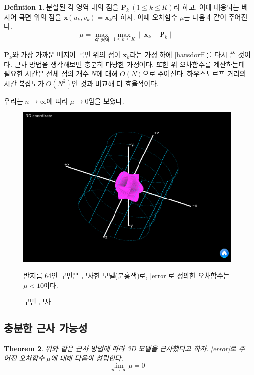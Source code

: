 \documentclass[10pt]{gshs-report-v2.0}
\theoremstyle{theorem}
\newtheorem{theorem}{Theorem}[section]
\theoremstyle{lemma}
\theoremstyle{definition}
\newtheorem{definition}[theorem]{Defintion}
\begin{document}
\begin{definition}
	분할된 각 영역 내의 점을 $\mathbf{P}_k\ (1\leq k\leq K)$라 하고, 이에 대응되는 베지어 곡면 위의 점을 $\mathbf{x}(u_k, v_k)=\mathbf{x}_k$라 하자. 이때 오차함수 $\mu$는 다음과 같이 주어진다.
	\begin{equation} \label{error}
		\mu=\max_{\text{각 영역}}\max_{1\leq k\leq K} \| \mathbf{x}_k-\mathbf{P}_k \|
	\end{equation}
\end{definition}

$\mathbf{P}_k$와 가장 가까운 베지어 곡면 위의 점이 $\mathbf{x}_k$라는 가정 하에 \cref{hausdorff}를 다시 쓴 것이다. 근사 방법을 생각해보면 충분히 타당한 가정이다. 또한 위 오차함수를 계산하는데 필요한 시간은 전체 점의 개수 $N$에 대해 $O(N)$으로 주어진다. 하우스도르프 거리의 시간 복잡도가 $O(N^2)$인 것과 비교해 더 효율적이다. 

우리는 $n\to\infty$에 따라 $\mu\to0$임을 보였다. 

\begin{figure}[h]
	\centering
	\includegraphics[width=\textwidth]{gg}
	\caption{구면 근사}
	\small 반지름 64인 구면은 근사한 모델(분홍색)로, \cref{error}로 정의한 오차함수는 $\mu<10$이다. 
\end{figure}

\subsection{충분한 근사 가능성}
\begin{theorem}
	위와 같은 근사 방법에 따라 3D 모델을 근사했다고 하자. \cref{error}로 주어진 오차함수 $\mu$에 대해 다음이 성립한다.
	\begin{equation*}
		\lim_{n\to\infty}\mu=0
	\end{equation*}
\end{theorem}
\end{document}
